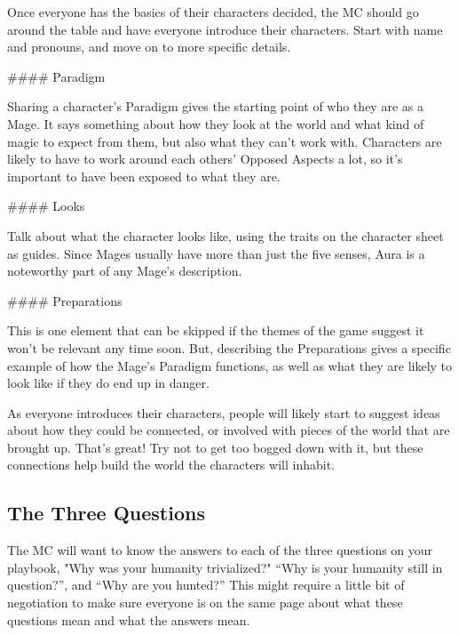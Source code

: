 \documentclass[
  oneside,
  statementpaper,
  9pt]{memoir}
\begin{document}
\begin{Narrator}

Once everyone has the basics of their characters decided, the MC should go around the table and have everyone introduce their characters. Start with name and pronouns, and move on to more specific details.

#### Paradigm

Sharing a character’s Paradigm gives the starting point of who they are as a Mage. It says something about how they look at the world and what kind of magic to expect from them, but also what they can’t work with. Characters are likely to have to work around each others’ Opposed Aspects a lot, so it’s important to have been exposed to what they are.

#### Looks

Talk about what the character looks like, using the traits on the character sheet as guides. Since Mages usually have more than just the five senses, Aura is a noteworthy part of any Mage’s description.

#### Preparations

This is one element that can be skipped if the themes of the game suggest it won’t be relevant any time soon. But, describing the Preparations gives a specific example of how the Mage’s Paradigm functions, as well as what they are likely to look like if they do end up in danger.

As everyone introduces their characters, people will likely start to suggest ideas about how they could be connected, or involved with pieces of the world that are brought up. That’s great! Try not to get too bogged down with it, but these connections help build the world the characters will inhabit.

\end{Narrator}

\hypertarget{the-three-questions}{%
\subsection{The Three Questions}\label{the-three-questions}}

\begin{Player}

The MC will want to know the answers to each of the three questions on your playbook, "Why was your humanity trivialized?" “Why is your humanity still in question?”, and “Why are you hunted?” This might require a little bit of negotiation to make sure everyone is on the same page about what these questions mean and what the answers mean.

\end{Player}
\end{document}
